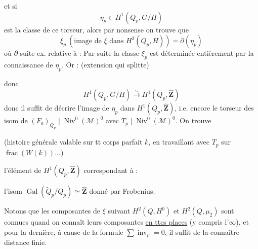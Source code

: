 et si
\[
\eta_p\in H^1(Q_p,G/H)
\]
est la classe de ce torseur, alors par  nonsense on trouve que
\[
\xi_p\ (\text{image de }\xi\text{ dans }H^2(Q_p,H))=\partial(\eta_p)
\]
où  $\partial$  suite ex. relative à :
Par suite la classe $\xi_p$ est déterminée entièrement par la connaissance de $\eta_p$. Or :
(extension qui splitte)

donc
\[
H^1(Q_p,G/H)\xrightarrow{\sim}H^1(Q_p,\widehat{\mathbf Z})
\]
donc il suffit de décrire l'image de $\eta_p$ dans $H^1(Q_p,\widehat{\mathbf Z})$, i.e. encore le torseur des isom de $(F_0)_{Q_p}\mid\operatorname{Niv}^0(\mathcal M)^0$ avec $T_p\mid\operatorname{Niv}^0(\mathcal M)^0$. On trouve

(histoire générale valable sur tt corps parfait $k$, en travaillant avec  $T_p$ sur  $\operatorname{frac}(W(k))$...)

l'élément de $H^1(Q_p,\widehat{\mathbf Z})$  correspondant à :

l'isom $\operatorname{Gal}(\widetilde Q_p/Q_p)\simeq\widehat{\mathbf Z}$ donné par Frobenius.

Notons que les composantes de $\xi$ suivant $H^2(Q,H^0)$ et $H^2(Q,\mu_2)$ sont connues quand on connaît leurs composantes \uline{en ttes places} (y compris l'$\infty$), et pour la dernière, à cause de la formule $\sum\operatorname{inv}_p=0$, il suffit de la connaître  distance finie.
